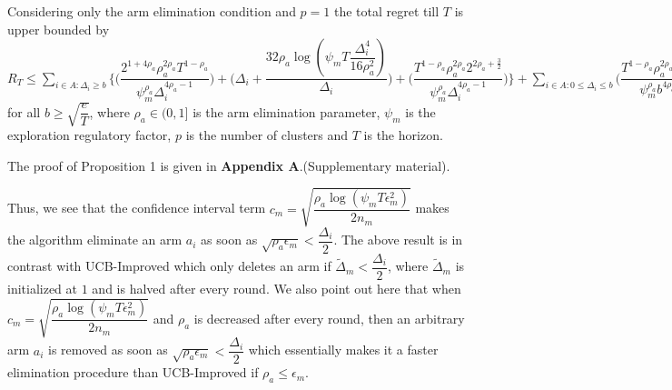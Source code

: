 \begin{proposition}
\label{Result:Prop:1}
Considering only the arm elimination condition and $p=1$ the total regret till $T$ is upper bounded by $R_{T}\leq \sum\limits_{i\in A:\Delta_{i}\geq b}\bigg\lbrace\bigg(\dfrac{2^{1+4\rho_{a}}\rho_{a}^{2\rho_{a}}T^{1-\rho_{a}}}{\psi_{m}^{\rho_{a}}\Delta_{i}^{4\rho_{a}-1}}\bigg) + \bigg(\Delta_{i}+\dfrac{32\rho_{a}\log{(\psi_{m}T\dfrac{\Delta_{i}^{4}}{16\rho_{a}^{2}})}}{\Delta_{i}}\bigg)  +  \bigg(\dfrac{T^{1-\rho_{a}}\rho_{a}^{2\rho_{a}}2^{2\rho_{a}+\frac{3}{2}}}{\psi_{m}^{\rho_{a}}\Delta_{i}^{4\rho_{a} -1}} \bigg) \bigg \rbrace+\sum\limits_{i\in A:0\leq\Delta_{i}\leq b}\bigg(\dfrac{T^{1-\rho_{a}}\rho_{a}^{2\rho_{a}}2^{2\rho_{a}+\frac{3}{2}}}{\psi_{m}^{\rho_{a}}b^{4\rho_{a} -1}} \bigg) + max_{i:\Delta_{i}\leq b}\Delta_{i}T$ for all $b\geq\sqrt{\dfrac{e}{T}}$, where $\rho_{a}\in (0,1]$ is the arm elimination parameter, $\psi_{m}$ is the exploration regulatory factor, $p$ is the number of clusters and $T$ is the horizon.
\end{proposition}


	The proof of Proposition 1 is given in \textbf{Appendix A}.(Supplementary material).

\begin{remark}
\label{Result:Rem:7}	
	Thus, we see that the confidence interval term $c_{m}=\sqrt{\dfrac{\rho_{a}\log (\psi_{m}T\epsilon_{m}^{2})}{2 n_{m}}}$ makes the algorithm eliminate an arm $a_{i}$ as soon as $\sqrt{\rho_{a}\epsilon_{m}}<\dfrac{\Delta_{i}}{2}$. The above result is in contrast with UCB-Improved which only deletes an arm if $\tilde{\Delta}_{m}<\dfrac{\Delta_{i}}{2}$, where $\tilde{\Delta}_{m}$ is initialized at $1$ and is halved after every round. We also point out here that when $c_{m}=\sqrt{\dfrac{\rho_{a}\log (\psi_{m}T\epsilon_{m}^{2})}{2 n_{m}}}$ and $\rho_{a}$ is decreased after every round, then an arbitrary arm $a_{i}$ is removed as soon as  $\sqrt{\rho_{a}\epsilon_{m}}<\dfrac{\Delta_{i}}{2}$ which essentially makes it a faster elimination procedure than UCB-Improved if $\rho_{a}\leq \epsilon_{m}$.
\end{remark}

